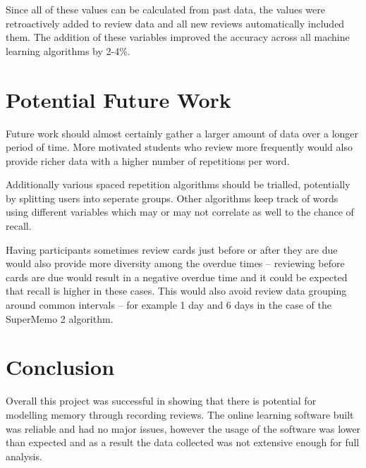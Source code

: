Since all of these values can be calculated from past data, the values were
retroactively added to review data and all new reviews automatically included them.
The addition of these variables improved the accuracy across all machine learning 
algorithms by 2-4\%.

\section{Potential Future Work}

Future work should almost certainly gather a larger amount of data over a longer period
of time. More motivated students who review more frequently would also provide richer
data with a higher number of repetitions per word.

Additionally various spaced repetition algorithms should be trialled, potentially by
splitting users into seperate groups. Other algorithms keep track of words
using different variables which may or may not correlate as well to the chance of
recall.

Having participants sometimes review cards just before or after they are due would
also provide more diversity among the overdue times -- reviewing before cards are due
would result in a negative overdue time and it could be expected that recall is higher
in these cases. This would also avoid review data grouping around common intervals --
for example 1 day and 6 days in the case of the SuperMemo 2 algorithm.



\section{Conclusion}

Overall this project was successful in showing that there is potential for
modelling memory through recording reviews. The online learning software built was
reliable and had no major issues, however the usage of the software was lower than
expected and as a result the data collected was not extensive enough for full analysis.







